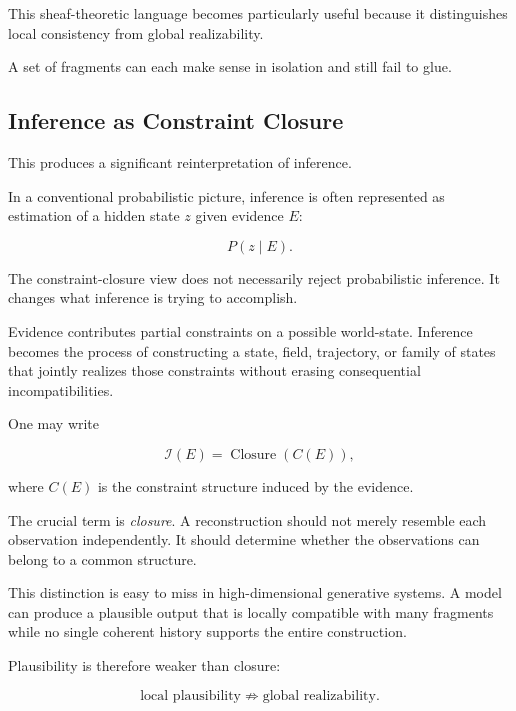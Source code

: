 \documentclass[11pt]{article}
\theoremstyle{remark}
\begin{document}
This sheaf-theoretic language becomes particularly useful because it distinguishes local consistency from global realizability.

A set of fragments can each make sense in isolation and still fail to glue.

\subsection{Inference as Constraint Closure}

This produces a significant reinterpretation of inference.

In a conventional probabilistic picture, inference is often represented as estimation of a hidden state $z$ given evidence $E$:

\begin{equation}
P(z\mid E).
\end{equation}

The constraint-closure view does not necessarily reject probabilistic inference. It changes what inference is trying to accomplish.

Evidence contributes partial constraints on a possible world-state. Inference becomes the process of constructing a state, field, trajectory, or family of states that jointly realizes those constraints without erasing consequential incompatibilities.

One may write

\begin{equation}
\mathcal{I}(E)
=
\operatorname{Closure}
\left(
C(E)
\right),
\end{equation}

where $C(E)$ is the constraint structure induced by the evidence.

The crucial term is \emph{closure}. A reconstruction should not merely resemble each observation independently. It should determine whether the observations can belong to a common structure.

This distinction is easy to miss in high-dimensional generative systems. A model can produce a plausible output that is locally compatible with many fragments while no single coherent history supports the entire construction.

Plausibility is therefore weaker than closure:

\begin{equation}
\text{local plausibility}
\not\Rightarrow
\text{global realizability}.
\end{equation}
\end{document}
